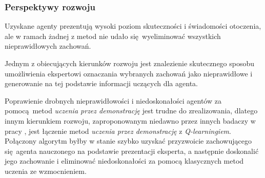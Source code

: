 \documentclass[polish,master,a4paper,oneside]{ppfcmthesis}
\begin{document}
\subsubsection{Perspektywy rozwoju}

Uzyskane agenty prezentują wysoki poziom skuteczności i świadomości otoczenia, ale w ramach żadnej z metod nie udało się wyeliminować wszystkich nieprawidłowych zachowań.

Jednym z obiecujących kierunków rozwoju jest znalezienie skutecznego sposobu umożliwienia ekspertowi oznaczania wybranych zachowań jako nieprawidłowe i generowanie na tej podstawie informacji uczących dla agenta.

Poprawienie drobnych nieprawidłowości i niedoskonałości agentów za pomocą metod \textit{uczenia przez demonstrację} jest trudne do zrealizowania, dlatego innym kierunkiem rozwoju, zaproponowanym niedawno przez innych badaczy w pracy \cite{DBLP:journals/corr/HesterVPLSPSDOA17}, jest łączenie metod \textit{uczenia przez demonstrację} z \textit{Q-learningiem}. Połączony algorytm byłby w stanie szybko uzyskać przyzwoicie zachowującego się agenta nauczonego na podstawie prezentacji eksperta, a następnie doskonalić jego zachowanie i eliminować niedoskonałości za pomocą klasycznych metod uczenia ze wzmocnieniem.



 \cleardoublepage\appendix

{\raggedright\sloppy\small}

\ppcolophon
\end{document}
